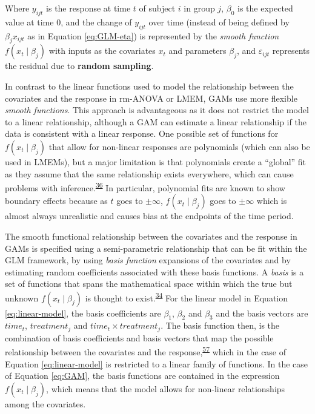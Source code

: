 \documentclass[
]{article}
\begin{document}
Where \(y_{ijt}\) is the response at time \(t\) of subject \(i\) in group \(j\), \(\beta_0\) is the expected value at time 0, and the change of \(y_{ijt}\) over time (instead of being defined by \(\beta_{j}x_{ijt}\) as in Equation \eqref{eq:GLM-eta}) is represented by the \emph{smooth function} \(f(x_t\mid \beta_j)\) with inputs as the covariates \(x_t\) and parameters \(\beta_j\), and \(\varepsilon_{ijt}\) represents the residual due to \textbf{random sampling}.

In contrast to the linear functions used to model the relationship between the covariates and the response in rm-ANOVA or LMEM, GAMs use more flexible \emph{smooth functions}. This approach is advantageous as it does not restrict the model to a linear relationship, although a GAM can estimate a linear relationship if the data is consistent with a linear response. One possible set of functions for \(f(x_t\mid \beta_j)\) that allow for non-linear responses are polynomials (which can also be used in LMEMs), but a major limitation is that polynomials create a ``global'' fit as they assume that the same relationship exists everywhere, which can cause problems with inference.\textsuperscript{\protect\hyperlink{ref-beck1998}{36}} In particular, polynomial fits are known to show boundary effects because as \(t\) goes to \(\pm \infty\), \(f(x_t \mid \beta_j)\) goes to \(\pm \infty\) which is almost always unrealistic and causes bias at the endpoints of the time period.

The smooth functional relationship between the covariates and the response in GAMs is specified using a semi-parametric relationship that can be fit within the GLM framework, by using \emph{basis function} expansions of the covariates and by estimating random coefficients associated with these basis functions. A \emph{basis} is a set of functions that spans the mathematical space within which the true but unknown \(f(x_t\mid \beta_j)\) is thought to exist.\textsuperscript{\protect\hyperlink{ref-simpson2018}{34}} For the linear model in Equation \eqref{eq:linear-model}, the basis coefficients are \(\beta_1\), \(\beta_2\) and \(\beta_3\) and the basis vectors are \(time_t\), \(treatment_j\) and \(time_t \times treatment_j\). The basis function then, is the combination of basis coefficients and basis vectors that map the possible relationship between the covariates and the response,\textsuperscript{\protect\hyperlink{ref-hefley2017}{57}} which in the case of Equation \eqref{eq:linear-model} is restricted to a linear family of functions. In the case of Equation \eqref{eq:GAM}, the basis functions are contained in the expression \(f(x_t\mid \beta_j)\), which means that the model allows for non-linear relationships among the covariates.
\end{document}
